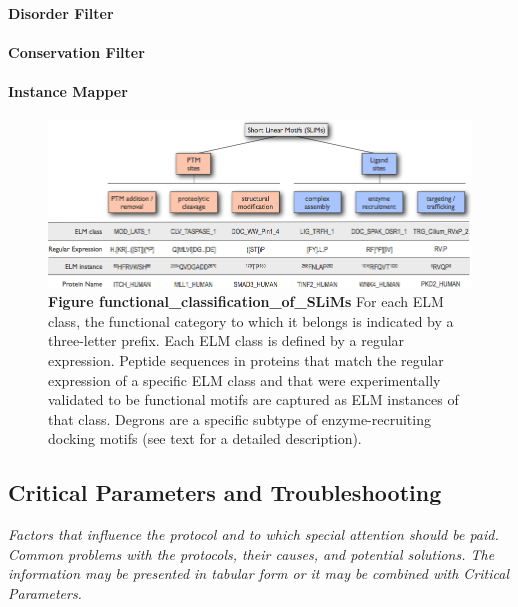 \documentclass[12pt]{article}
\newcounter{proto}
\begin{document}
\paragraph*{Disorder Filter}\label{DisorderFilter}
\paragraph*{Conservation Filter}\label{ConservationFilter}
\paragraph*{Instance Mapper}\label{InstanceMapper}

\begin{figure}[h!]
\centering
\includegraphics[width=\textwidth]{Figures/Introduction/functional_classification_of_SLiMs.png}
\caption{
\textbf{Figure functional\_classification\_of\_SLiMs} For each ELM class, the
functional category to which it belongs is indicated by a three-letter prefix.
Each ELM class is defined by a regular expression. Peptide sequences in
proteins that match the regular expression of a specific ELM class and that
were experimentally validated to be functional motifs are captured as ELM
instances of that class. Degrons are a specific subtype of enzyme-recruiting
docking motifs (see text for a detailed description).
}
\label{fig:SLiMclasses}
\end{figure}

\subsection*{Critical Parameters and Troubleshooting}\label{critical-parameters-and-troubleshooting}

\emph{Factors that influence the protocol and to which special attention should be paid.
Common problems with the protocols, their causes, and potential solutions. The information may be presented in tabular form or it may be combined with Critical Parameters.
}
\end{document}
